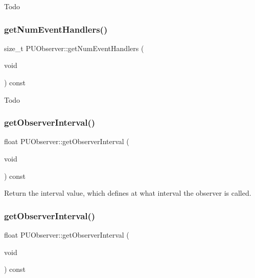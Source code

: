 Todo \mbox{\label{classPUObserver_af173b2134fc4b4d2eae639cff104fe02}} 
\subsubsection{\texorpdfstring{get\+Num\+Event\+Handlers()}{getNumEventHandlers()}\hspace{0.1cm}{\footnotesize\ttfamily [2/2]}}
{\footnotesize\ttfamily size\+\_\+t P\+U\+Observer\+::get\+Num\+Event\+Handlers (\begin{DoxyParamCaption}\item[{void}]{ }\end{DoxyParamCaption}) const}

Todo \mbox{\label{classPUObserver_aeff68820bc2e27913c0b1f8bc18753d0}} 
\subsubsection{\texorpdfstring{get\+Observer\+Interval()}{getObserverInterval()}\hspace{0.1cm}{\footnotesize\ttfamily [1/2]}}
{\footnotesize\ttfamily float P\+U\+Observer\+::get\+Observer\+Interval (\begin{DoxyParamCaption}\item[{void}]{ }\end{DoxyParamCaption}) const}

Return the interval value, which defines at what interval the observer is called. \mbox{\label{classPUObserver_aeff68820bc2e27913c0b1f8bc18753d0}} 
\subsubsection{\texorpdfstring{get\+Observer\+Interval()}{getObserverInterval()}\hspace{0.1cm}{\footnotesize\ttfamily [2/2]}}
{\footnotesize\ttfamily float P\+U\+Observer\+::get\+Observer\+Interval (\begin{DoxyParamCaption}\item[{void}]{ }\end{DoxyParamCaption}) const}

